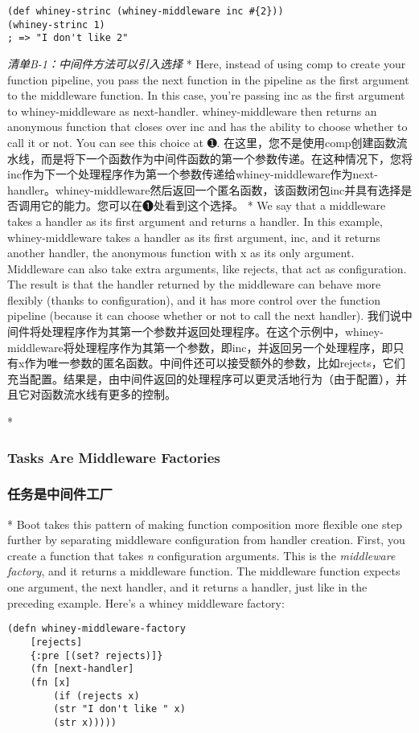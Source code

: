 \begin{paracol}{2}
\begin{verbatim}
(def whiney-strinc (whiney-middleware inc #{2}))
(whiney-strinc 1)
; => "I don't like 2"
\end{verbatim}
\emph{清单B-1：中间件方法可以引入选择}
\switchcolumn[0]*
Here, instead of using comp to create your function pipeline, you pass
the next function in the pipeline as the first argument to the
middleware function. In this case, you're passing inc as the first
argument to whiney-middleware as next-handler. whiney-middleware then
returns an anonymous function that closes over inc and has the ability
to choose whether to call it or not. You can see this choice at ➊.
\switchcolumn
在这里，您不是使用comp创建函数流水线，而是将下一个函数作为中间件函数的第一个参数传递。在这种情况下，您将inc作为下一个处理程序作为第一个参数传递给whiney-middleware作为next-handler。whiney-middleware然后返回一个匿名函数，该函数闭包inc并具有选择是否调用它的能力。您可以在➊处看到这个选择。
\switchcolumn[0]*
We say that a middleware takes a handler as its first argument and
returns a handler. In this example, whiney-middleware takes a handler as
its first argument, inc, and it returns another handler, the anonymous
function with x as its only argument. Middleware can also take extra
arguments, like rejects, that act as configuration. The result is that
the handler returned by the middleware can behave more flexibly (thanks
to configuration), and it has more control over the function pipeline
(because it can choose whether or not to call the next handler).
\switchcolumn
我们说中间件将处理程序作为其第一个参数并返回处理程序。在这个示例中，whiney-middleware将处理程序作为其第一个参数，即inc，并返回另一个处理程序，即只有x作为唯一参数的匿名函数。中间件还可以接受额外的参数，比如rejects，它们充当配置。结果是，由中间件返回的处理程序可以更灵活地行为（由于配置），并且它对函数流水线有更多的控制。


\switchcolumn[0]*
\subsubsection{Tasks Are Middleware Factories}
\switchcolumn
\subsubsection{任务是中间件工厂}
\switchcolumn[0]*
Boot takes this pattern of making function composition more flexible one
step further by separating middleware configuration from handler
creation. First, you create a function that takes \emph{n} configuration
arguments. This is the \emph{middleware factory}, and it returns a
middleware function. The middleware function expects one argument, the
next handler, and it returns a handler, just like in the preceding
example. Here's a whiney middleware factory:
\begin{verbatim}
(defn whiney-middleware-factory
    [rejects]
    {:pre [(set? rejects)]}
    (fn [next-handler]
    (fn [x]
        (if (rejects x)
        (str "I don't like " x)
        (str x)))))


\end{verbatim}
\end{paracol}
